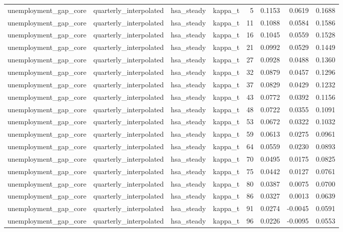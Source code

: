\begin{tabular}{llllrrrr}
unemployment\_gap\_core & quarterly\_interpolated & hsa\_steady & kappa\_t & 5 & 0.1153 & 0.0619 & 0.1688 \\
unemployment\_gap\_core & quarterly\_interpolated & hsa\_steady & kappa\_t & 11 & 0.1088 & 0.0584 & 0.1586 \\
unemployment\_gap\_core & quarterly\_interpolated & hsa\_steady & kappa\_t & 16 & 0.1045 & 0.0559 & 0.1528 \\
unemployment\_gap\_core & quarterly\_interpolated & hsa\_steady & kappa\_t & 21 & 0.0992 & 0.0529 & 0.1449 \\
unemployment\_gap\_core & quarterly\_interpolated & hsa\_steady & kappa\_t & 27 & 0.0928 & 0.0488 & 0.1360 \\
unemployment\_gap\_core & quarterly\_interpolated & hsa\_steady & kappa\_t & 32 & 0.0879 & 0.0457 & 0.1296 \\
unemployment\_gap\_core & quarterly\_interpolated & hsa\_steady & kappa\_t & 37 & 0.0829 & 0.0429 & 0.1232 \\
unemployment\_gap\_core & quarterly\_interpolated & hsa\_steady & kappa\_t & 43 & 0.0772 & 0.0392 & 0.1156 \\
unemployment\_gap\_core & quarterly\_interpolated & hsa\_steady & kappa\_t & 48 & 0.0722 & 0.0355 & 0.1091 \\
unemployment\_gap\_core & quarterly\_interpolated & hsa\_steady & kappa\_t & 53 & 0.0672 & 0.0322 & 0.1032 \\
unemployment\_gap\_core & quarterly\_interpolated & hsa\_steady & kappa\_t & 59 & 0.0613 & 0.0275 & 0.0961 \\
unemployment\_gap\_core & quarterly\_interpolated & hsa\_steady & kappa\_t & 64 & 0.0559 & 0.0230 & 0.0893 \\
unemployment\_gap\_core & quarterly\_interpolated & hsa\_steady & kappa\_t & 70 & 0.0495 & 0.0175 & 0.0825 \\
unemployment\_gap\_core & quarterly\_interpolated & hsa\_steady & kappa\_t & 75 & 0.0442 & 0.0127 & 0.0761 \\
unemployment\_gap\_core & quarterly\_interpolated & hsa\_steady & kappa\_t & 80 & 0.0387 & 0.0075 & 0.0700 \\
unemployment\_gap\_core & quarterly\_interpolated & hsa\_steady & kappa\_t & 86 & 0.0327 & 0.0013 & 0.0639 \\
unemployment\_gap\_core & quarterly\_interpolated & hsa\_steady & kappa\_t & 91 & 0.0274 & -0.0045 & 0.0591 \\
unemployment\_gap\_core & quarterly\_interpolated & hsa\_steady & kappa\_t & 96 & 0.0226 & -0.0095 & 0.0553 \\

\end{tabular}
